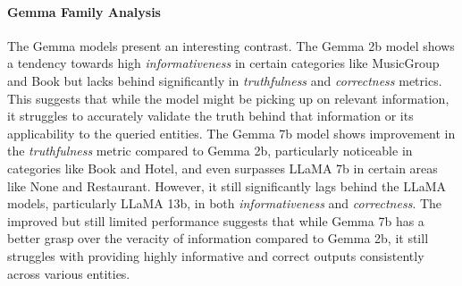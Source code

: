 \paragraph{Gemma Family Analysis}
The Gemma models present an interesting contrast. The Gemma 2b model shows a tendency towards high \textit{informativeness} in certain categories like MusicGroup and Book but lacks behind significantly in \textit{truthfulness} and \textit{correctness} metrics. This suggests that while the model might be picking up on relevant information, it struggles to accurately validate the truth behind that information or its applicability to the queried entities.
The Gemma 7b model shows improvement in the \textit{truthfulness} metric compared to Gemma 2b, particularly noticeable in categories like Book and Hotel, and even surpasses LLaMA 7b in certain areas like None and Restaurant. However, it still significantly lags behind the LLaMA models, particularly LLaMA 13b, in both \textit{informativeness} and \textit{correctness}. The improved but still limited performance suggests that while Gemma 7b has a better grasp over the veracity of information compared to Gemma 2b, it still struggles with providing highly informative and correct outputs consistently across various entities.
